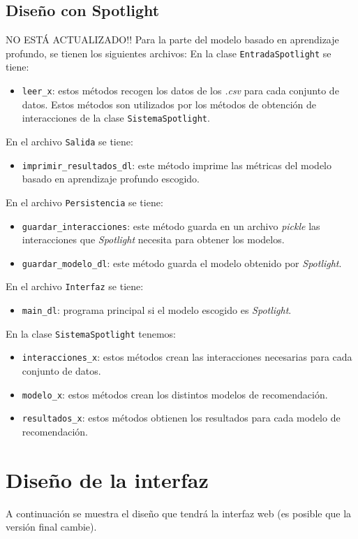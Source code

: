 \subsection{Diseño con Spotlight}\label{diseño-spotlight}
NO ESTÁ ACTUALIZADO!!
Para la parte del modelo basado en aprendizaje profundo, se tienen los siguientes archivos:
En la clase \texttt{EntradaSpotlight} se tiene:
\begin{itemize}
\tightlist
\item \texttt{leer\_x}: estos métodos recogen los datos de los \textit{.csv} para cada conjunto de datos. Estos métodos son utilizados por los métodos de obtención de interacciones de la clase \texttt{SistemaSpotlight}.
\end{itemize}

En el archivo \texttt{Salida} se tiene:
\begin{itemize}
\tightlist
\item \texttt{imprimir\_resultados\_dl}: este método imprime las métricas del modelo basado en aprendizaje profundo escogido.
\end{itemize}

En el archivo \texttt{Persistencia} se tiene:
\begin{itemize}
\tightlist
\item \texttt{guardar\_interacciones}: este método guarda en un archivo \textit{pickle} las interacciones que \textit{Spotlight} necesita para obtener los modelos.
\item \texttt{guardar\_modelo\_dl}: este método guarda el modelo obtenido por \textit{Spotlight}.
\end{itemize}

En el archivo \texttt{Interfaz} se tiene:
\begin{itemize}
\tightlist 
\item \texttt{main\_dl}: programa principal si el modelo escogido es \textit{Spotlight}. 
\end{itemize}

En la clase \texttt{SistemaSpotlight} tenemos:
\begin{itemize}
\tightlist
\item \texttt{interacciones\_x}: estos métodos crean las interacciones necesarias para cada conjunto de datos. 
\item \texttt{modelo\_x}: estos métodos crean los distintos modelos de recomendación. 
\item \texttt{resultados\_x}: estos métodos obtienen los resultados para cada modelo de recomendación. 
\end{itemize}

\section{Diseño de la interfaz}\label{diseño-gui}
A continuación se muestra el diseño que tendrá la interfaz web (es posible que la versión final cambie).

\begin{landscape}
\end{landscape} 
